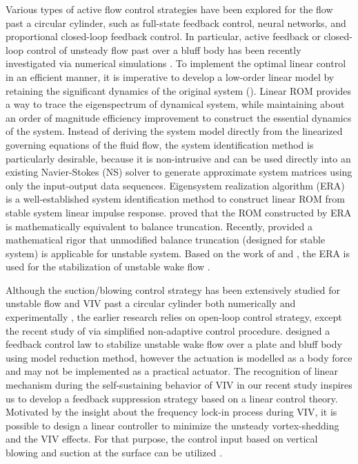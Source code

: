 \documentclass[standard]{jfm}
\begin{document}
Various types of active flow control strategies have been explored for the flow past a circular cylinder, such as full-state feedback control, neural networks, and proportional closed-loop 
feedback control. 
In particular, active feedback or closed-loop control of unsteady flow past over a bluff body has 
been recently investigated via numerical simulations \citep{Ahuja2010,parkin2014,Flinois2016}.  
To implement the optimal linear control in an efficient manner, it is imperative to 
develop a low-order linear model by retaining the significant dynamics of 
the original system (\cite{Ahuja2010,Flinois2016}). 
Linear ROM provides a way to trace the eigenspectrum of dynamical system,
while maintaining about an order of magnitude efficiency improvement 
to construct the essential dynamics of the system. Instead of deriving the
system model directly from the linearized governing equations of the fluid flow, 
the system identification method is particularly desirable, because 
it is non-intrusive and can be used directly into an existing Navier-Stokes (NS) solver 
to generate approximate system matrices using only the input-output data sequences. 
Eigensystem realization algorithm (ERA) \citep{Juang1985} is a well-established system identification method to
construct linear ROM from stable system linear impulse response. \cite{Ma2011} proved that the ROM constructed by
ERA is mathematically equivalent to balance truncation. Recently, \cite{Flinois2015} provided a mathematical rigor that 
unmodified balance truncation (designed for stable system) is applicable for unstable system. Based on the work of 
\cite{Ma2011} and \cite{Flinois2015}, the ERA is used for the stabilization of unstable wake flow \citep{Flinois2016}.  
 
Although the suction/blowing control strategy has been extensively studied for unstable flow and 
VIV past a circular cylinder both numerically \citep{Kim2005,Dong2008,mao2015,Wang2016b} 
and experimentally \citep{Fransson20041031,Chen201325,Chen2015},
the earlier research relies on open-loop control strategy, except the recent study 
of \cite{Wang2016b} via simplified non-adaptive control procedure. \cite{Ahuja2010,Flinois2016} designed a feedback control law 
to stabilize unstable wake flow over a plate and bluff body using model 
reduction method, however the actuation is modelled as a body force and 
may not be implemented as a practical actuator.
The recognition of linear mechanism during the self-sustaining behavior of VIV in our recent study \citep{YaoJFM2016} inspires us to develop a feedback suppression strategy 
based on a linear control theory. 
Motivated by the insight about the frequency lock-in process during VIV, 
it is possible to design a linear controller
to minimize the unsteady vortex-shedding and the VIV effects. For that purpose,
the control input based on vertical blowing and suction at the surface 
can be utilized \citep{Kim2005}. 
\end{document}
